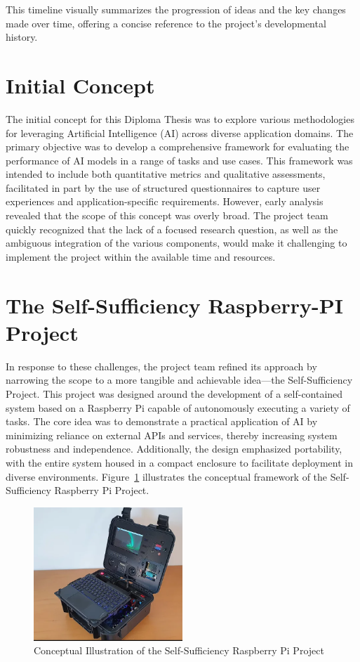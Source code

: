 This timeline visually summarizes the progression of ideas and the key changes made over time, offering a concise reference to the project's developmental history.

\section{Initial Concept}

The initial concept for this Diploma Thesis was to explore various methodologies for leveraging Artificial Intelligence (AI) across diverse application domains. The primary objective was to develop a comprehensive framework for evaluating the performance of AI models in a range of tasks and use cases. This framework was intended to include both quantitative metrics and qualitative assessments, facilitated in part by the use of structured questionnaires to capture user experiences and application-specific requirements. However, early analysis revealed that the scope of this concept was overly broad. The project team quickly recognized that the lack of a focused research question, as well as the ambiguous integration of the various components, would make it challenging to implement the project within the available time and resources.

\section{The Self-Sufficiency Raspberry-PI Project}

In response to these challenges, the project team refined its approach by narrowing the scope to a more tangible and achievable idea—the Self-Sufficiency Project. This project was designed around the development of a self-contained system based on a Raspberry Pi capable of autonomously executing a variety of tasks. The core idea was to demonstrate a practical application of AI by minimizing reliance on external APIs and services, thereby increasing system robustness and independence. Additionally, the design emphasized portability, with the entire system housed in a compact enclosure to facilitate deployment in diverse environments. Figure~\ref{fig:SelfSufficiencyProject} illustrates the conceptual framework of the Self-Sufficiency Raspberry Pi Project.

\begin{figure}[H]
    \centering
    \includegraphics[width=0.5\textwidth]{figures/SAIPIA-concept-picture.png}
    \caption{Conceptual Illustration of the Self-Sufficiency Raspberry Pi Project}
    \label{fig:SelfSufficiencyProject}
\end{figure}

